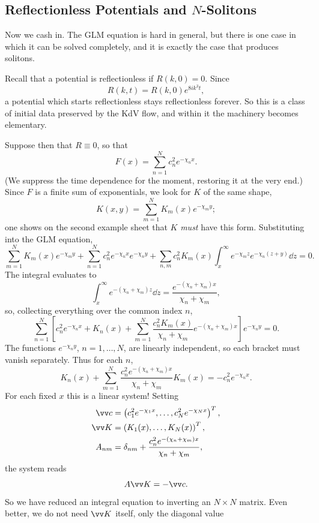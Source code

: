 \subsection{Reflectionless Potentials and \texorpdfstring{$N$}{N}-Solitons}

Now we cash in. The GLM equation is hard in general, but there is one case in which it can be solved completely, and it is exactly the case that produces solitons.

Recall that a potential is reflectionless if $R(k,0) = 0$. Since
$$
R(k,t) = R(k,0)e^{8ik^3t},
$$
a potential which starts reflectionless stays reflectionless forever. So this is a class of initial data preserved by the KdV flow, and within it the machinery becomes elementary.

Suppose then that $R \equiv 0$, so that
$$
F(x) = \sum_{n=1}^Nc_n^2e^{-\chi_nx}.
$$
(We suppress the time dependence for the moment, restoring it at the very end.) Since $F$ is a finite sum of exponentials, we look for $K$ of the same shape,
$$
K(x,y) = \sum_{m=1}^NK_m(x)e^{-\chi_my};
$$
one shows on the second example sheet that $K$ \emph{must} have this form. Substituting into the GLM equation,
$$
\sum_{m=1}^NK_m(x)e^{-\chi_my} + \sum_{n=1}^Nc_n^2e^{-\chi_nx}e^{-\chi_ny} + \sum_{n,m}c_n^2K_m(x)\int_x^\infty e^{-\chi_mz}e^{-\chi_n(z+y)}\dd z = 0.
$$
The integral evaluates to
$$
\int_x^\infty e^{-(\chi_n+\chi_m)z}\dd z = \frac{e^{-(\chi_n+\chi_m)x}}{\chi_n+\chi_m},
$$
so, collecting everything over the common index $n$,
\begin{equation*}
\sum_{n=1}^N\left[c_n^2e^{-\chi_nx} + K_n(x) + \sum_{m=1}^N\frac{c_n^2K_m(x)}{\chi_n+\chi_m}e^{-(\chi_n+\chi_m)x}\right]e^{-\chi_ny} = 0.\tag{$*$}
\end{equation*}
The functions $e^{-\chi_ny}$, $n=1,\dots,N$, are linearly independent, so each bracket must vanish separately. Thus for each $n$,
$$
K_n(x) + \sum_{m=1}^N\frac{c_n^2e^{-(\chi_n+\chi_m)x}}{\chi_n+\chi_m}K_m(x) = -c_n^2e^{-\chi_nx}.
$$
For each fixed $x$ this is a linear system! Setting
\begin{align*}
	\vv c &= \left(c_1^2e^{-\chi_1x}, \dots, c_N^2e^{-\chi_Nx}\right)^T,\\
	\vv K &= \left(K_1(x),\dots,K_N(x)\right)^T,\\
	A_{nm} &= \delta_{nm} + \frac{c_n^2e^{-(\chi_n+\chi_m)x}}{\chi_n+\chi_m},
\end{align*}
the system reads
$$
A\vv K = -\vv c.
$$
So we have reduced an integral equation to inverting an $N\times N$ matrix. Even better, we do not need $\vv K$ itself, only the diagonal value
